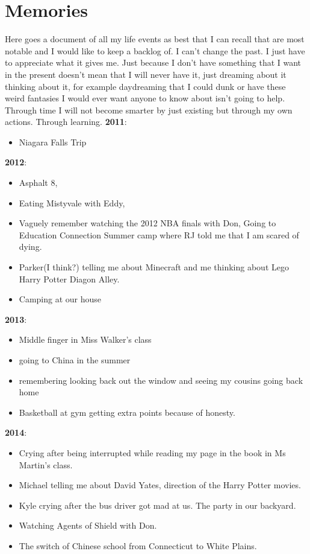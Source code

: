 \documentclass[12pt]{article}
\begin{document}
\section{Memories}
Here goes a document of all my life events as best that I can recall that are most notable and I would like to keep a backlog of. I can't change the past. I just have to appreciate what it gives me. Just because I don't have something that I want in the present doesn't mean that I will never have it, just dreaming about it thinking about it, for example daydreaming that I could dunk or have these weird fantasies I would ever want anyone to know about isn't going to help. Through time I will not become smarter by just existing but through my own actions. Through learning.
 \textbf{2011}:\begin{itemize} \item Niagara Falls Trip \end{itemize}
\textbf{2012}: \begin{itemize}\item Asphalt 8, \item Eating Mistyvale with Eddy, \item Vaguely remember watching the 2012 NBA finals with Don, Going to Education Connection Summer camp where RJ told me that I am scared of dying. \item Parker(I think?) telling me about Minecraft and me thinking about Lego Harry Potter Diagon Alley. \item Camping at our house
\end{itemize}
\textbf{2013}:\begin{itemize}\item  Middle finger in Miss Walker's class \item going to China in the summer \item remembering looking back out the window and seeing my cousins going back home\item Basketball at gym getting extra points because of honesty.\end{itemize}
 \textbf{2014}: \begin{itemize}\item Crying after being interrupted while reading my page in the book in Ms Martin's class. \item Michael telling me about David Yates, direction of the Harry Potter movies. \item Kyle crying after the bus driver got mad at us. The party in our backyard.\item Watching Agents of Shield with Don. \item The switch of Chinese school from Connecticut to White Plains.\end{itemize}
\end{document}
